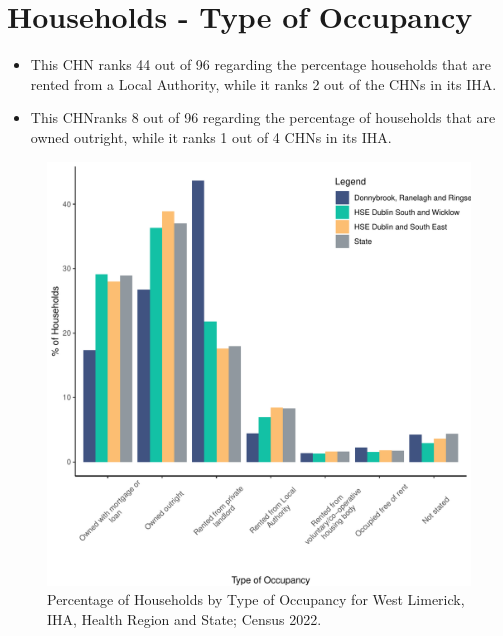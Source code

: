 \documentclass{article}
\begin{document}
\section{Households - Type of Occupancy}\label{sect:Households}
\begin{itemize}
\item This CHN ranks  44 out of 96 regarding the percentage households that are rented from a Local Authority, while it ranks  2 out of the CHNs in its IHA. 
\item This CHNranks  8 out of 96 regarding the percentage of households that are owned outright, while it ranks   1 out of 4 CHNs in its IHA.
\end{itemize}
\begin{figure}[H]
	\centering
	\includegraphics[width = 140mm]{../figures/HouseholdsED.pdf}
	\caption{Percentage of Households by Type of Occupancy for West Limerick, IHA, Health Region and State; Census 2022.}
	\label{fig:vbnv}
	\end{figure}
\end{document}
